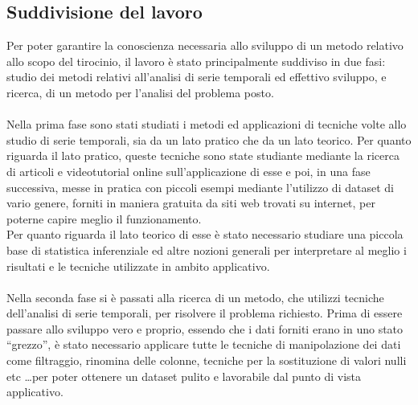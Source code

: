 \subsection{Suddivisione del lavoro}
Per poter garantire la conoscienza necessaria allo sviluppo di un metodo relativo allo scopo
del tirocinio, il lavoro è stato principalmente suddiviso in due fasi: studio dei metodi
relativi all'analisi di serie temporali ed effettivo sviluppo, e ricerca, di un metodo per l'analisi
del problema posto.\\
\\
Nella prima fase sono stati studiati i metodi ed applicazioni di tecniche volte allo studio
di serie temporali, sia da un lato pratico che da un lato teorico. Per quanto riguarda il lato 
pratico, queste tecniche sono state studiante mediante la ricerca di articoli e videotutorial online
sull'applicazione di esse e poi, in una fase successiva, messe in pratica con piccoli esempi 
mediante l'utilizzo di dataset di vario genere, forniti in maniera gratuita da siti web trovati 
su internet, per poterne capire meglio il funzionamento.\\
Per quanto riguarda il lato teorico di esse è stato necessario studiare una piccola base di statistica
inferenziale ed altre nozioni generali per interpretare al meglio i risultati e le tecniche utilizzate in 
ambito applicativo.\\
\\
Nella seconda fase si è passati alla ricerca di un metodo, che utilizzi 
tecniche dell'analisi di serie temporali, per risolvere il problema richiesto.
Prima di essere passare allo sviluppo vero e proprio, 
essendo che i dati forniti erano in uno stato ``grezzo'', è stato 
necessario applicare tutte le tecniche di manipolazione dei dati come filtraggio, 
rinomina delle colonne, tecniche per la sostituzione di valori nulli etc \dots per poter 
ottenere un dataset pulito e lavorabile dal punto di vista applicativo. 